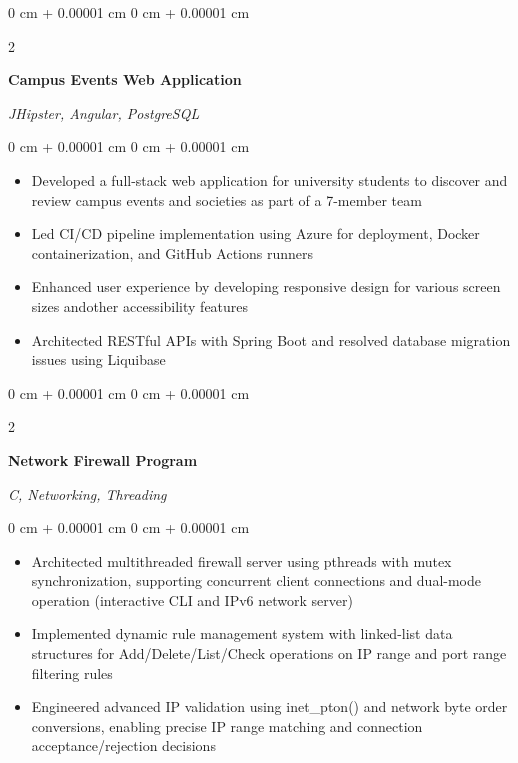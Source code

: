 \documentclass[10pt, a4paper]{article}
\newenvironment{highlights}{
    \begin{itemize}[
        topsep=0.10 cm,
        parsep=0.10 cm,
        partopsep=0pt,
        itemsep=0pt,
        leftmargin=20pt
    ]
}{
    \end{itemize}
} %
\newenvironment{onecolentry}{
    \begin{adjustwidth}{
        0 cm + 0.00001 cm
    }{
        0 cm + 0.00001 cm
    }
}{
    \end{adjustwidth}
} %
\newenvironment{twocolentry}[2][]{
    \onecolentry
    \def\secondColumn{#2}
    \setcolumnwidth{\fill, 4.5 cm}
    \begin{paracol}{2}
}{
    \switchcolumn \raggedleft \secondColumn
    \end{paracol}
    \endonecolentry
} %
\begin{document}

    \begin{twocolentry}{
        \textit{JHipster, Angular, PostgreSQL}
    }
        \textbf{Campus Events Web Application}
    \end{twocolentry}

    \vspace{0.10 cm}
    \begin{onecolentry}
        \begin{highlights}
            \item Developed a full-stack web application for university students to discover and review campus events and societies as part of a 7-member team
            \item Led CI/CD pipeline implementation using Azure for deployment, Docker containerization, and GitHub Actions runners
            \item Enhanced user experience by developing responsive design for various screen sizes andother accessibility features
            \item Architected RESTful APIs with Spring Boot and resolved database migration issues using Liquibase
        \end{highlights}
    \end{onecolentry}

    \vspace{0.2 cm}

    \begin{twocolentry}{
        \textit{C, Networking, Threading}
    }
        \textbf{Network Firewall Program}
    \end{twocolentry}

    \vspace{0.10 cm}
    \begin{onecolentry}
        \begin{highlights}
            \item Architected multithreaded firewall server using pthreads with mutex synchronization, supporting concurrent client connections and dual-mode operation (interactive CLI and IPv6 network server)
            \item Implemented dynamic rule management system with linked-list data structures for Add/Delete/List/Check operations on IP range and port range filtering rules
            \item Engineered advanced IP validation using inet\_pton() and network byte order conversions, enabling precise IP range matching and connection acceptance/rejection decisions
        \end{highlights}
    \end{onecolentry}
\end{document}
